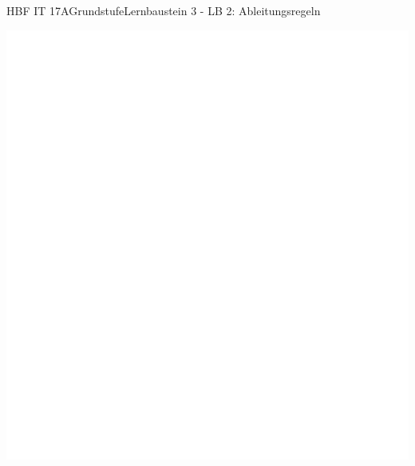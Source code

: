 \documentclass[oneside,openany,headings=optiontotoc,11pt,numbers=noenddot]{scrreprt}
\begin{document}
\begin{worksheet}{HBF IT 17A}{Grundstufe}{Lernbaustein 3 - LB 2: Ableitungsregeln}
\begin{framed}
			\includegraphics[scale=1]{../empty.jpg}
		\end{framed}
	\end{worksheet}
\end{document}
